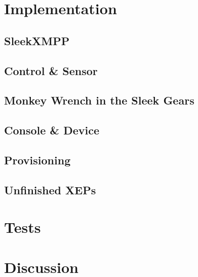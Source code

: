 \documentclass{sig-alternate}
\begin{document}
\section{Implementation}



\subsection{SleekXMPP}



\subsection{Control \& Sensor}



\subsection{Monkey Wrench in the Sleek Gears}



\subsection{Console \& Device}



\subsection{Provisioning}



\subsection{Unfinished XEPs}



\section{Tests}

\section{Discussion}
\end{document}
